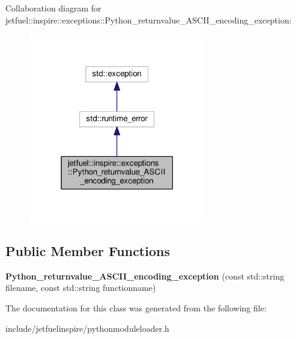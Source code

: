 Collaboration diagram for jetfuel\+:\+:inspire\+:\+:exceptions\+:\+:Python\+\_\+returnvalue\+\_\+\+A\+S\+C\+I\+I\+\_\+encoding\+\_\+exception\+:\nopagebreak
\begin{figure}[H]
\begin{center}
\leavevmode
\includegraphics[width=219pt]{classjetfuel_1_1inspire_1_1exceptions_1_1Python__returnvalue__ASCII__encoding__exception__coll__graph}
\end{center}
\end{figure}
\subsection*{Public Member Functions}
\begin{DoxyCompactItemize}
\item 
\mbox{\label{classjetfuel_1_1inspire_1_1exceptions_1_1Python__returnvalue__ASCII__encoding__exception_a654d896ec64d3fbb9720e295d52a7f76}} 
{\bfseries Python\+\_\+returnvalue\+\_\+\+A\+S\+C\+I\+I\+\_\+encoding\+\_\+exception} (const std\+::string filename, const std\+::string functionname)
\end{DoxyCompactItemize}


The documentation for this class was generated from the following file\+:\begin{DoxyCompactItemize}
\item 
include/jetfuelinspire/pythonmoduleloader.\+h\end{DoxyCompactItemize}
